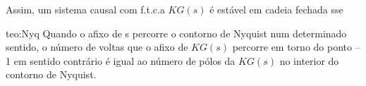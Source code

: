 \noindent Assim, um sistema causal com f.t.c.a $KG(s)$ é estável em cadeia fechada sse

\begin{theo}{teo:Nyq}\label{teo:Nyq}
    Quando o afixo de s percorre o contorno de Nyquist num determinado sentido, o número de voltas que o afixo de $KG(s)$ percorre em torno do ponto –1 em sentido contrário é igual ao número de pólos da $KG(s)$ no interior do contorno de Nyquist.
\end{theo}

